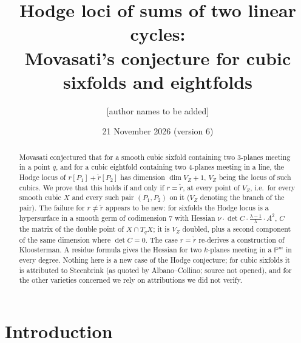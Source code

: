 \documentclass[10pt]{article}
\title{Hodge loci of sums of two linear cycles:\\ Movasati's conjecture for cubic sixfolds and eightfolds}
\author{[author names to be added]}
\date{21 November 2026 (version 6)}
\numberwithin{equation}{section}
\theoremstyle{remark}
\newcommand{\PP}{\mathbb{P}}
\newcommand{\VZ}{V_Z}
\begin{document}
\maketitle

\begin{center}
\end{center}

\begin{abstract}
Movasati conjectured that for a smooth cubic sixfold containing two $3$-planes meeting in a point $q$, and for a
cubic eightfold containing two $4$-planes meeting in a line, the Hodge locus of $r[P_1]+\check r[P_2]$ has
dimension $\dim\VZ+1$, $\VZ$ being the locus of such cubics. We prove that this holds if and only if
$r=\check r$, at every point of $\VZ$, i.e.\ for every smooth cubic $X$ and every such pair $(P_1,P_2)$ on it
($\VZ$ denoting the branch of the pair). The failure for $r\neq\check r$ appears to be new: for sixfolds the Hodge
locus is a hypersurface in a smooth germ of codimension $7$ with Hessian
$\nu\cdot\det C\cdot\frac{\lambda-1}{\lambda}\cdot A^2$, $C$ the matrix of the double point of $X\cap T_qX$; it
is $\VZ$ doubled, plus a second component of the same dimension where $\det C=0$. The case $r=\check r$
re-derives a construction of Kloosterman. A residue formula gives the Hessian for two $k$-planes meeting in a
$\PP^m$ in every degree. Nothing here is a new case of the Hodge conjecture; for cubic sixfolds it is attributed
to Steenbrink (as quoted by Albano--Collino; source not opened), and for the other varieties concerned we rely
on attributions we did not verify.
\end{abstract}

\section{Introduction}\label{sec:intro}
\end{document}
